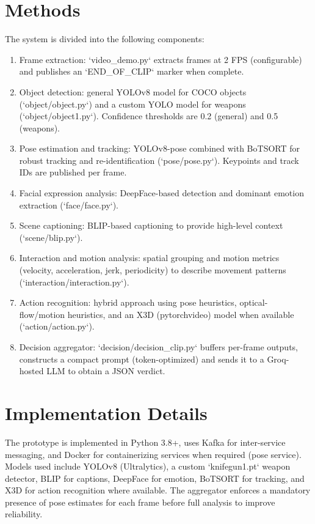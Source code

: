 \documentclass[conference]{IEEEtran}
\begin{document}
\section{Methods}
The system is divided into the following components:
\begin{enumerate}
  \item Frame extraction: `video_demo.py` extracts frames at 2 FPS (configurable) and publishes an `END_OF_CLIP` marker when complete.
  \item Object detection: general YOLOv8 model for COCO objects (`object/object.py`) and a custom YOLO model for weapons (`object/object1.py`). Confidence thresholds are 0.2 (general) and 0.5 (weapons).
  \item Pose estimation and tracking: YOLOv8-pose combined with BoTSORT for robust tracking and re-identification (`pose/pose.py`). Keypoints and track IDs are published per frame.
  \item Facial expression analysis: DeepFace-based detection and dominant emotion extraction (`face/face.py`).
  \item Scene captioning: BLIP-based captioning to provide high-level context (`scene/blip.py`).
  \item Interaction and motion analysis: spatial grouping and motion metrics (velocity, acceleration, jerk, periodicity) to describe movement patterns (`interaction/interaction.py`).
  \item Action recognition: hybrid approach using pose heuristics, optical-flow/motion heuristics, and an X3D (pytorchvideo) model when available (`action/action.py`).
  \item Decision aggregator: `decision/decision_clip.py` buffers per-frame outputs, constructs a compact prompt (token-optimized) and sends it to a Groq-hosted LLM to obtain a JSON verdict.
\end{enumerate}

\section{Implementation Details}
The prototype is implemented in Python 3.8+, uses Kafka for inter-service messaging, and Docker for containerizing services when required (pose service). Models used include YOLOv8 (Ultralytics), a custom `knifegun1.pt` weapon detector, BLIP for captions, DeepFace for emotion, BoTSORT for tracking, and X3D for action recognition where available. The aggregator enforces a mandatory presence of pose estimates for each frame before full analysis to improve reliability.
\end{document}
